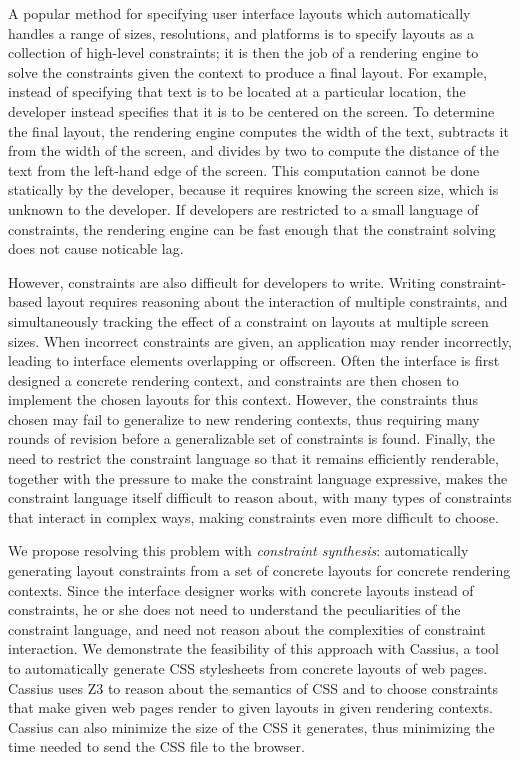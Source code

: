 \documentclass[10pt]{sigplanconf}
\newcommand{\name}{Cassius\xspace}
\begin{document}
A popular method for specifying user interface layouts
  which automatically handles a range of sizes, resolutions, and platforms
  is to specify layouts as a collection of high-level constraints;
  it is then the job of a rendering engine to solve the constraints
  given the context
  to produce a final layout.
For example, instead of specifying
  that text is to be located at a particular location,
  the developer instead specifies that it is to be centered on the screen.
To determine the final layout,
  the rendering engine computes the width of the text,
  subtracts it from the width of the screen,
  and divides by two
  to compute the distance of the text
  from the left-hand edge of the screen.
This computation cannot be done statically by the developer,
  because it requires knowing the screen size,
  which is unknown to the developer.
If developers are restricted to a small language of constraints,
  the rendering engine can be fast enough
  that the constraint solving does not cause noticable lag.

However, constraints are also difficult for developers to write.
Writing constraint-based layout requires reasoning about
  the interaction of multiple constraints,
  and simultaneously tracking the effect of a constraint
  on layouts at multiple screen sizes.
When incorrect constraints are given,
  an application may render incorrectly,
  leading to interface elements overlapping or offscreen.
Often the interface is first designed a concrete rendering context,
  and constraints are then chosen to implement
  the chosen layouts for this context.
However, the constraints thus chosen may fail to generalize
  to new rendering contexts,
  thus requiring many rounds of revision
  before a generalizable set of constraints is found.
Finally, the need to restrict the constraint language
  so that it remains efficiently renderable,
  together with the pressure to make the constraint language expressive,
  makes the constraint language itself difficult to reason about,
  with many types of constraints that interact in complex ways,
  making constraints even more difficult to choose.

We propose resolving this problem with \emph{constraint synthesis}:
  automatically generating layout constraints
  from a set of concrete layouts for concrete rendering contexts.
Since the interface designer works with concrete layouts instead of constraints,
  he or she does not need to understand the peculiarities of the constraint language,
  and need not reason about the complexities of constraint interaction.
We demonstrate the feasibility of this approach with \name,
  a tool to automatically generate CSS stylesheets
  from concrete layouts of web pages.
\name uses Z3
  to reason about the semantics of CSS
  and to choose constraints that make
  given web pages render to given layouts in given rendering contexts.
\name can also minimize the size of the CSS it generates,
  thus minimizing the time needed to send the CSS file to the browser.
\end{document}
